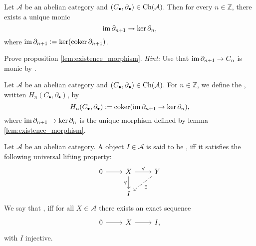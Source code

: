 \begin{proposition}
	\label{lem:existence_morphism}
	Let $\mathcal{A}$ be an abelian category and $(C_\bullet,\partial_\bullet) \in \operatorname{Ch}(\mathcal{A})$. Then for every $n \in \mathbb{Z}$, there exists a unique monic 
	\begin{equation*}
		\operatorname{im} \partial_{n + 1} \to \ker \partial_n,
	\end{equation*}
	\noindent where $\operatorname{im} \partial_{n + 1} := \ker(\operatorname{coker} \partial_{n + 1})$.
\end{proposition}

\begin{exercise}
	Prove proposition \ref{lem:existence_morphism}. \emph{Hint:} Use that $\operatorname{im} \partial_{n + 1} \to C_n$ is monic by \cite[199]{maclane:categories:1978}.
\end{exercise}

\begin{definition}[Homology]
	Let $\mathcal{A}$ be an abelian category and $(C_\bullet,\partial_\bullet) \in \operatorname{Ch}(\mathcal{A})$. For $n \in \mathbb{Z}$, we define the , written $H_n(C_\bullet,\partial_\bullet)$, by
	\begin{equation*}
		H_n(C_\bullet,\partial_\bullet) := \operatorname{coker}(\operatorname{im} \partial_{n + 1} \to \ker \partial_n),
	\end{equation*}
	\noindent where $\operatorname{im} \partial_{n + 1} \to \ker \partial_n$ is the unique morphism defined by lemma \ref{lem:existence_morphism}.
\end{definition}

\begin{definition}[Injective]
	Let $\mathcal{A}$ be an abelian category. A object $I \in \mathcal{A}$ is said to be , iff it satisfies the following universal lifting property:
	\begin{equation*}
		\begin{tikzcd}
			0 \arrow[r] & X\arrow[r,"\forall"]\arrow[d,"\forall"'] & Y \arrow[dl,dashed,"\exists"]\\
			& I
		\end{tikzcd}
	\end{equation*}
	We say that , iff for all $X \in \mathcal{A}$ there exists an exact sequence
	\begin{equation*}
		\begin{tikzcd}
			0 \arrow[r] & X \arrow[r] & I,
		\end{tikzcd}
	\end{equation*}
	\noindent with $I$ injective.
\end{definition}

